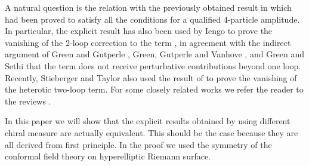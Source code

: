 \documentclass[a4paper,12pt]{article}
\begin{document}
A natural question is the relation with the previously obtained
result in \cite{IengoZhu2, IengoZhu3, Zhu} which had been proved
to satisfy all the conditions for a qualified 4-particle
amplitude. In particular, the explicit result has also been used
by Iengo \cite{Iengo} to prove the vanishing of the 2-loop
correction to the \coordHE{} term \cite{GrossWitten}, in agreement with
the indirect argument of Green and Gutperle \cite{GreenGutperle},
Green, Gutperle and Vanhove \cite{Green2}, and Green and Sethi
\cite{GreenSethi} that the \coordHE{} term does not receive
perturbative contributions beyond one loop. Recently, Stieberger
and Taylor \cite{Stieberger}  also used the result of
\cite{IengoZhu2, IengoZhu3, Zhu} to prove the vanishing of the
heterotic two-loop \coordHE{} term. For some closely related works we
refer the reader to the reviews \cite{Green3, Kiritsis}.

In this paper we will show that the explicit results obtained by
using different chiral measure are actually equivalent. This
should be the case because they are all derived from first
principle. In the proof we used the \coordHE{} symmetry of the
conformal field theory on hyperelliptic Riemann surface.
\end{document}
